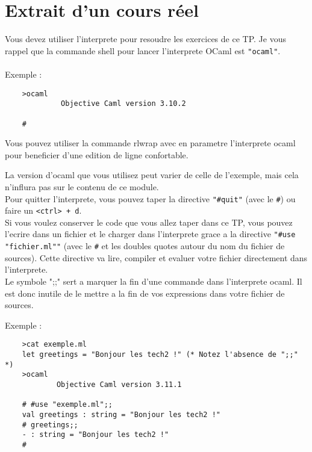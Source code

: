 \documentclass{life-fr}
\begin{document}
\chapter{Extrait d'un cours réel}

    Vous devez utiliser l'interprete pour resoudre les exercices de ce TP. Je
  vous rappel que la commande shell pour lancer l'interprete OCaml est
  \texttt{"ocaml"}.\\
\\  Exemple :

  \begin{lstlisting}
    >ocaml
             Objective Caml version 3.10.2

    #
  \end{lstlisting}

  \hint
  {
    Vous pouvez utiliser la commande rlwrap avec en parametre l'interprete ocaml
    pour beneficier d'une edition de ligne confortable.
  }

    La version d'ocaml que vous utilisez peut varier de celle de l'exemple, mais
  cela n'influra pas sur le contenu de ce module.\\
  Pour quitter l'interprete, vous pouvez taper la directive \texttt{"\#quit"}
  (avec le \texttt{\#}) ou faire un \texttt{<ctrl> + d}.\\

  Si vous voulez conserver le code que vous allez taper dans ce TP, vous pouvez
  l'ecrire dans un fichier et le charger dans l'interprete grace a la directive
  \texttt{"\#use "fichier.ml""} (avec le \texttt{\#} et les doubles quotes autour
  du nom du fichier de sources). Cette directive va lire, compiler et evaluer
  votre fichier directement dans l'interprete.\\

  \hint
  {
    Le symbole ";;" sert a marquer la fin d'une commande dans l'interprete
    ocaml. Il est donc inutile de le mettre a la fin de vos expressions dans
    votre fichier de sources.
  }

  Exemple :

  \begin{lstlisting}
    >cat exemple.ml
    let greetings = "Bonjour les tech2 !" (* Notez l'absence de ";;" *)
    >ocaml
            Objective Caml version 3.11.1

    # #use "exemple.ml";;
    val greetings : string = "Bonjour les tech2 !"
    # greetings;;
    - : string = "Bonjour les tech2 !"
    #
  \end{lstlisting}
\end{document}

